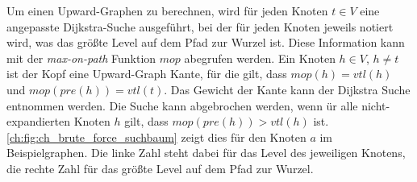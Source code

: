 Um einen Upward-Graphen zu berechnen, wird für jeden Knoten $t \in V$ eine angepasste Dijkstra-Suche ausgeführt, bei der für jeden Knoten jeweils notiert wird, was das größte Level auf dem Pfad zur Wurzel ist.
Diese Information kann mit der \emph{max-on-path} Funktion ${mop}$ abegrufen werden.
Ein Knoten $h \in V$, $h \neq t$ ist der Kopf eine Upward-Graph Kante, für die gilt, dass ${mop}(h) = {vtl}(h)$ und ${mop}({pre}(h)) = {vtl}(t)$.
Das Gewicht der Kante kann der Dijkstra Suche entnommen werden.
Die Suche kann abgebrochen werden, wenn ür alle nicht-expandierten Knoten $h$ gilt, dass ${mop}({pre}(h)) > {vtl}(h)$ ist.
\autoref{ch:fig:ch_brute_force_suchbaum} zeigt dies für den Knoten $a$ im Beispielgraphen.
Die linke Zahl steht dabei für das Level des jeweiligen Knotens, die rechte Zahl für das größte Level auf dem Pfad zur Wurzel.

